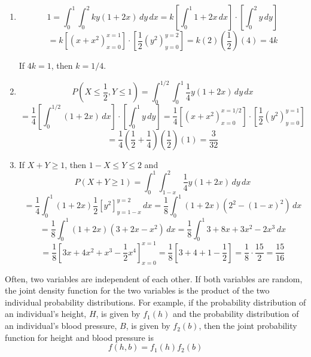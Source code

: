 \begin{Answer}[ref = joint]
\begin{enumerate}
    \item $$1 = \int_0^1 \int_0^2 ky\left(1 + 2x \right)\,dy\,dx = k \left[ 
    \int_0^1 1 + 2x\,dx \right] \cdot \left[ \int_0^2 y \,dy \right]$$
    $$= k \left[ \left(x + x^2 \right)_{x = 0}^{x = 1} \right] \cdot \left[ 
    \frac{1}{2} \left( y^2 \right)_{y = 0}^{y = 2} \right] = k \left( 2 \right)
    \left( \frac{1}{2} \right) \left(4 \right) = 4k$$

    If $4k = 1$, then $k = 1/4$. 

    \item $$P(X \leq \frac{1}{2}, Y \leq 1) = \int_0^{1/2} \int_0^1 \frac{1}{4}
    y \left(1 + 2x \right)\,dy\,dx$$
    $$= \frac{1}{4} \left[ \int_0^{1/2} \left(1 + 2x \right)\,dx \right] \cdot 
    \left[ \int_0^1 y\,dy \right] = \frac{1}{4} \left[ \left(x + x^2 \right)_{
    x = 0}^{x = 1/2} \right] \cdot \left[ \frac{1}{2} \left(y^2 \right)_{y = 0}
    ^{y = 1} \right]$$
    $$= \frac{1}{4} \left( \frac{1}{2} + \frac{1}{4} \right) \left( \frac{1}{2}
    \right) \left( 1 \right) = \frac{3}{32}$$

    \item If $X + Y \geq 1$, then $1 - X \leq Y \leq 2$ and 
    $$P(X + Y \geq 1 ) = \int_0^1 \int_{1 - x}^2 \frac{1}{4} y \left(1 + 2x 
    \right)\,dy\,dx$$
    $$= \frac{1}{4} \int_0^1 \left(1 + 2x \right) \frac{1}{2} \left[y^2 \right]
    _{y = 1 - x}^{y = 2}\,dx = \frac{1}{8} \int_0^1 \left(1 + 2x \right) \left(
    2^2 - \left(1 - x \right)^2 \right)\,dx$$
    $$= \frac{1}{8} \int_0^1 \left(1 + 2x \right) \left(3 + 2x - x^2 \right)\,
    dx = \frac{1}{8} \int_0^1 3 + 8x + 3x^2 - 2x^3\,dx$$
    $$= \frac{1}{8} \left[ 3x + 4x^2 + x^3 - \frac{1}{2}x^4 \right]_{x = 0}^{x 
    = 1} = \frac{1}{8} \left[3 + 4 + 1 - \frac{1}{2} \right] = \frac{1}{8} 
    \cdot \frac{15}{2} = \frac{15}{16}$$
\end{enumerate}
\end{Answer}

Often, two variables are independent of each other. If both variables are 
random, the joint density function for the two variables is the product of the 
two individual probability distributions. For example, if the probability 
distribution of an individual's height, $H$, is given by $f_1(h)$ and the 
probability distribution of an individual's blood pressure, $B$, is given by 
$f_2(b)$, then the joint probability function for height and blood pressure is 
$$f(h, b) = f_1(h)f_2(b)$$


